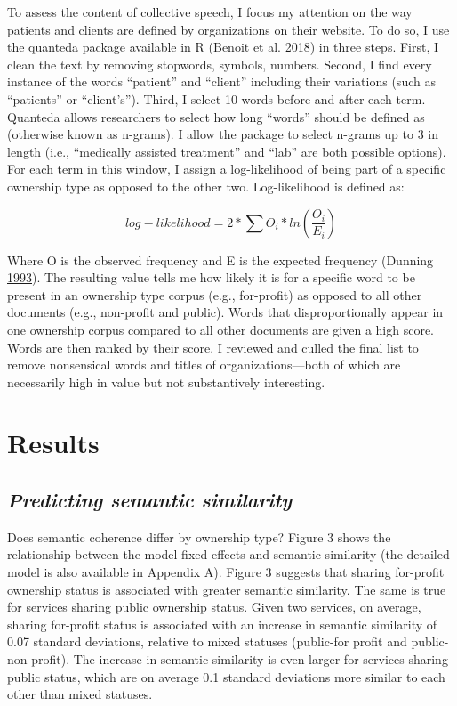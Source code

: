 \documentclass[
  12pt,
]{article}
\begin{document}
To assess the content of collective speech, I focus my attention on the way patients and clients are defined by organizations on their website. To do so, I use the quanteda package available in R (Benoit et al. \protect\hyperlink{ref-benoit2018}{2018}) in three steps. First, I clean the text by removing stopwords, symbols, numbers. Second, I find every instance of the words ``patient'' and ``client'' including their variations (such as ``patients'' or ``client's''). Third, I select 10 words before and after each term. Quanteda allows researchers to select how long ``words'' should be defined as (otherwise known as n-grams). I allow the package to select n-grams up to 3 in length (i.e., ``medically assisted treatment'' and ``lab'' are both possible options). For each term in this window, I assign a log-likelihood of being part of a specific ownership type as opposed to the other two. Log-likelihood is defined as:

\vspace{12pt}

\[log-likelihood = 2*\sum{O_i*ln(\frac{O_i}{E_i})}\]

\vspace{12pt}

Where O is the observed frequency and E is the expected frequency (Dunning \protect\hyperlink{ref-dunning1993}{1993}). The resulting value tells me how likely it is for a specific word to be present in an ownership type corpus (e.g., for-profit) as opposed to all other documents (e.g., non-profit and public). Words that disproportionally appear in one ownership corpus compared to all other documents are given a high score. Words are then ranked by their score. I reviewed and culled the final list to remove nonsensical words and titles of organizations---both of which are necessarily high in value but not substantively interesting.

\hypertarget{results}{%
\section{Results}\label{results}}

\hypertarget{predicting-semantic-similarity}{%
\subsection{\texorpdfstring{\emph{Predicting semantic similarity}}{Predicting semantic similarity}}\label{predicting-semantic-similarity}}

Does semantic coherence differ by ownership type? Figure 3 shows the relationship between the model fixed effects and semantic similarity (the detailed model is also available in Appendix A). Figure 3 suggests that sharing for-profit ownership status is associated with greater semantic similarity. The same is true for services sharing public ownership status. Given two services, on average, sharing for-profit status is associated with an increase in semantic similarity of 0.07 standard deviations, relative to mixed statuses (public-for profit and public-non profit). The increase in semantic similarity is even larger for services sharing public status, which are on average 0.1 standard deviations more similar to each other than mixed statuses.
\end{document}

